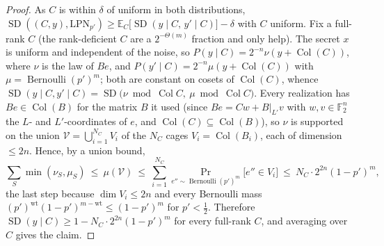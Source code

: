 \documentclass[11pt,a4paper]{article}
\theoremstyle{plain}
\theoremstyle{definition}
\newcommand{\F}{\mathbb{F}}
\begin{document}
\begin{proof}
As $C$ is within $\delta$ of uniform in both distributions, $\operatorname{SD}((C,y),\mathrm{LPN}_{p'})\ge \mathbb{E}_{C}\bigl[\operatorname{SD}(y\mid C,\,y'\mid C)\bigr]-\delta$ with $C$ uniform. Fix a full-rank $C$ (the rank-deficient $C$ are a $2^{-\Theta(m)}$ fraction and only help). The secret $x$ is uniform and independent of the noise, so $P(y\mid C)=2^{-n}\nu(y+\operatorname{Col}(C))$, where $\nu$ is the law of $Be$, and $P(y'\mid C)=2^{-n}\mu(y+\operatorname{Col}(C))$ with $\mu=\operatorname{Bernoulli}(p')^{m}$; both are constant on cosets of $\operatorname{Col}(C)$, whence $\operatorname{SD}(y\mid C,y'\mid C)=\operatorname{SD}\bigl(\nu\bmod\operatorname{Col} C,\ \mu\bmod\operatorname{Col} C\bigr)$. Every realization has $Be\in\operatorname{Col}(B)$ for the matrix $B$ it used (since $Be=Cw+B|_{L'}v$ with $w,v\in\F_2^n$ the $L$- and $L'$-coordinates of $e$, and $\operatorname{Col}(C)\subseteq\operatorname{Col}(B)$), so $\nu$ is supported on the union $\mathcal{V}=\bigcup_{i=1}^{N_C}V_i$ of the $N_C$ cages $V_i=\operatorname{Col}(B_i)$, each of dimension $\le 2n$. Hence, by a union bound,
\[
\sum_S\min(\nu_S,\mu_S)\ \le\ \mu(\mathcal{V})\ \le\ \sum_{i=1}^{N_C}\Pr_{e''\sim\operatorname{Bernoulli}(p')^m}\!\bigl[e''\in V_i\bigr]\ \le\ N_C\cdot 2^{2n}(1-p')^{m},
\]
the last step because $\dim V_i\le 2n$ and every Bernoulli mass $(p')^{\mathrm{wt}}(1-p')^{m-\mathrm{wt}}\le(1-p')^{m}$ for $p'<\tfrac12$. Therefore $\operatorname{SD}(y\mid C)\ge 1-N_C\cdot 2^{2n}(1-p')^{m}$ for every full-rank $C$, and averaging over $C$ gives the claim.
\end{proof}
\end{document}
